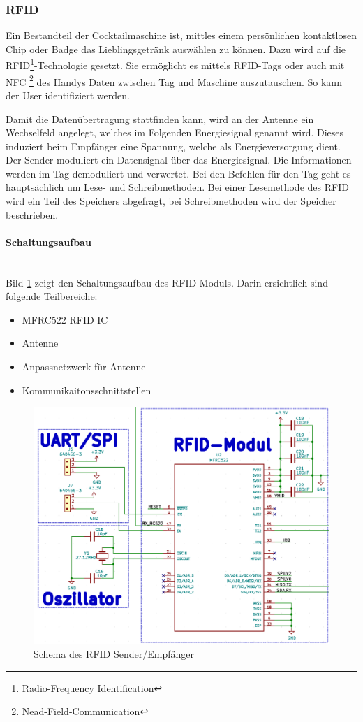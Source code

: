 \subsubsection{RFID}
\label{subsubsec:RFID}

Ein Bestandteil der Cocktailmaschine ist, mittles einem persönlichen kontaktlosen Chip oder Badge das Lieblingsgetränk auswählen zu können. Dazu wird auf die RFID\footnote{Radio-Frequency Identification}-Technologie gesetzt. Sie ermöglicht es mittels RFID-Tags oder auch mit NFC \footnote{Nead-Field-Communication} des Handys Daten zwischen Tag und Maschine auszutauschen. So kann der User identifiziert werden.

Damit die Datenübertragung stattfinden kann, wird an der Antenne ein Wechselfeld angelegt, welches im Folgenden Energiesignal genannt wird. Dieses induziert beim Empfänger eine Spannung, welche als Energieversorgung dient. Der Sender moduliert ein Datensignal über das Energiesignal. Die Informationen werden im Tag demoduliert und verwertet. Bei den Befehlen für den Tag geht es hauptsächlich um Lese- und Schreibmethoden. Bei einer Lesemethode des RFID wird ein Teil des Speichers abgefragt, bei Schreibmethoden wird der Speicher beschrieben.

\paragraph{Schaltungsaufbau}\mbox{}\\

Bild \ref{fig:Schema_RFID} zeigt den Schaltungsaufbau des RFID-Moduls. Darin ersichtlich sind folgende Teilbereiche:

\begin{itemize}
\item MFRC522 RFID IC
\item Antenne
\item Anpassnetzwerk für Antenne
\item Kommunikaitonsschnittstellen
\end{itemize}

\begin{figure}[!h]
\center
\includegraphics[width = 0.5 \textwidth]{graphics/Schema_RFID}
\caption{Schema des RFID Sender/Empfänger}
\label{fig:Schema_RFID}
\end{figure}

